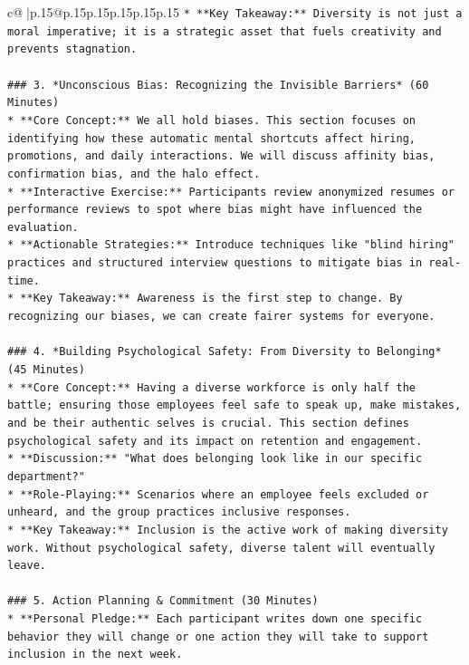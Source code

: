 \documentclass{article}
\begin{document}
{\begin{supertabular}{c@{$\;$}|p{.15\linewidth}@{}p{.15\linewidth}p{.15\linewidth}p{.15\linewidth}p{.15\linewidth}p{.15\linewidth}}
{{{\texttt{*   **Key Takeaway:** Diversity is not just a moral imperative; it is a strategic asset that fuels creativity and prevents stagnation.} \\
\\ 
\texttt{\#\#\# 3. *Unconscious Bias: Recognizing the Invisible Barriers* (60 Minutes)} \\
\texttt{*   **Core Concept:** We all hold biases. This section focuses on identifying how these automatic mental shortcuts affect hiring, promotions, and daily interactions. We will discuss affinity bias, confirmation bias, and the halo effect.} \\
\texttt{*   **Interactive Exercise:** Participants review anonymized resumes or performance reviews to spot where bias might have influenced the evaluation.} \\
\texttt{*   **Actionable Strategies:** Introduce techniques like "blind hiring" practices and structured interview questions to mitigate bias in real{-}time.} \\
\texttt{*   **Key Takeaway:** Awareness is the first step to change. By recognizing our biases, we can create fairer systems for everyone.} \\
\\ 
\texttt{\#\#\# 4. *Building Psychological Safety: From Diversity to Belonging* (45 Minutes)} \\
\texttt{*   **Core Concept:** Having a diverse workforce is only half the battle; ensuring those employees feel safe to speak up, make mistakes, and be their authentic selves is crucial. This section defines psychological safety and its impact on retention and engagement.} \\
\texttt{*   **Discussion:** "What does belonging look like in our specific department?"} \\
\texttt{*   **Role{-}Playing:** Scenarios where an employee feels excluded or unheard, and the group practices inclusive responses.} \\
\texttt{*   **Key Takeaway:** Inclusion is the active work of making diversity work. Without psychological safety, diverse talent will eventually leave.} \\
\\ 
\texttt{\#\#\# 5. Action Planning \& Commitment (30 Minutes)} \\
\texttt{*   **Personal Pledge:** Each participant writes down one specific behavior they will change or one action they will take to support inclusion in the next week.} \\
}}}
\end{supertabular}}
\end{document}

